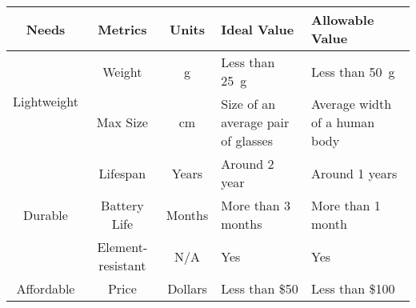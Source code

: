 \begin{tabular}{| c | c | c | m{10.5em}| m{10.5em} |}\hline
  Needs & Metrics & Units & Ideal Value & Allowable Value\\\hline\hline
  \multirow{2}{*}{Lightweight}
        & Weight & \unit{\g} & Less than \qty{25}{\g} & Less than
                                                        \qty{50}{\g}\\\cline{2-5} 
        & Max Size & \unit{\cm}
                          & Size of an average pair of glasses
                                        & Average width of a human body\\\hline
  \multirow{3}{*}{Durable}
        & Lifespan & Years & Around 2 year & Around 1 years\\\cline{2-5}
        & Battery Life & Months & More than 3 months & More than 1 month\\\cline{2-5}
        & Element-resistant & N/A & Yes & Yes\\\hline
  Affordable & Price & Dollars & Less than \$50 & Less than \$100\\\hline
\end{tabular}

